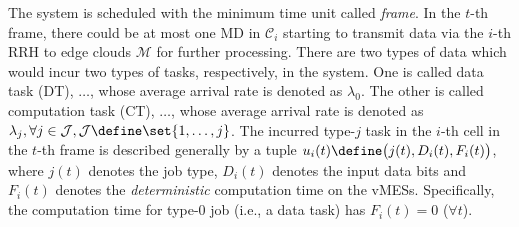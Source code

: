 The system is scheduled with the minimum time unit called \emph{frame}.
In the $t$-th frame, there could be at most one MD in $\mathcal{C}_{i}$ starting to transmit data via the $i$-th RRH to edge clouds $\mathcal{M}$ for further processing.
There are two types of data which would incur two types of tasks, respectively, in the system.
One is called data task (DT), $\dots$, whose average arrival rate is denoted as $\lambda_{0}$.
The other is called computation task (CT), $\dots$, whose average arrival rate is denoted as $\lambda_{j}, \forall j\in\mathcal{J}, \mathcal{J} \define \set{1,\dots,j}$. 
The incurred type-$j$ task in the $i$-th cell in the $t$-th frame is described generally by a tuple $u_{i}(t) \define \big( j(t), D_{i}(t), F_{i}(t) \big)$, where $j(t)$ denotes the job type, $D_{i}(t)$ denotes the input data bits and $F_{i}(t)$ denotes the \emph{deterministic} computation time on the vMESs.
Specifically, the computation time for type-$0$ job (i.e., a data task) has $F_{i}(t)=0$ ($\forall t$).


